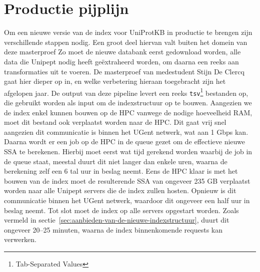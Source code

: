 \section{Productie pijplijn}
Om een nieuwe versie van de index voor UniProtKB in productie te brengen zijn verschillende stappen nodig.
Een groot deel hiervan valt buiten het domein van deze masterproef
Zo moet de nieuwe databank eerst gedownload worden, alle data die Unipept nodig heeft geëxtraheerd worden, om daarna een reeks aan transformaties uit te voeren.
De masterproef van medestudent Stijn De Clercq gaat hier dieper op in, en welke verbetering hieraan toegebracht zijn het afgelopen jaar.
De output van deze pipeline levert een reeks \texttt{tsv}\footnote{Tab-Separated Values} bestanden op, die gebruikt worden als input om de indexstructuur op te bouwen.
Aangezien we de index enkel kunnen bouwen op de HPC vanwege de nodige hoeveelheid RAM, moet dit bestand ook verplaatst worden naar de HPC\@.
Dit gaat vrij snel aangezien dit communicatie is binnen het UGent netwerk, wat aan 1 Gbps kan.
Daarna wordt er een job op de HPC in de queue gezet om de effectieve nieuwe SSA te berekenen.
Hierbij moet eerst wat tijd gerekend worden waarbij de job in de queue staat, meestal duurt dit niet langer dan enkele uren, waarna de berekening zelf een 6 tal uur in beslag neemt.
Eens de HPC klaar is met het bouwen van de index moet de resulterende SSA van ongeveer 235 GB verplaatst worden naar alle Unipept servers die de index zullen hosten.
Opnieuw is dit communicatie binnen het UGent netwerk, waardoor dit ongeveer een half uur in beslag neemt.
Tot slot moet de index op alle servers opgestart worden.
Zoals vermeld in sectie~\ref{sec:aanbieden-van-de-nieuwe-indexstructuur}, duurt dit ongeveer 20--25 minuten, waarna de index binnenkomende requests kan verwerken.
